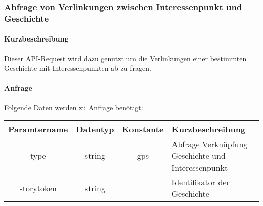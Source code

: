 \subsubsection{Abfrage von Verlinkungen zwischen Interessenpunkt und Geschichte}
\paragraph{Kurzbeschreibung}Dieser API-Request wird dazu genutzt um die Verlinkungen einer bestimmten Geschichte mit Interessenpunkten ab zu fragen.
\paragraph{Anfrage}Folgende Daten werden zu Anfrage benötigt:
\begin{table}[H]
	\begin{tabular}{|c|c|c|p{6.5cm}|}
		\hline
		\textbf{Paramtername} & \textbf{Datentyp} & \textbf{Konstante} & \textbf{Kurzbeschreibung}                                                                                               \\ \hline
		type                & string            & gps                & Abfrage Verknüpfung Geschichte und Interessenpunkt \\ \hline
		storytoken          & string            &                    & Identifikator der Geschichte \\ \hline
	\end{tabular}
\end{table}
